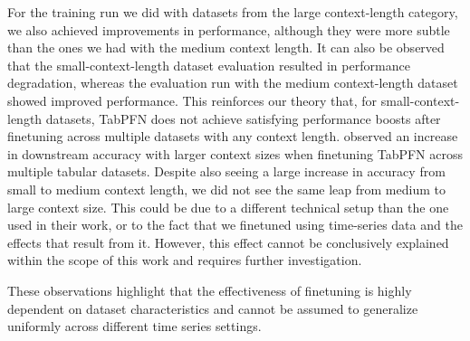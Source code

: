 For the training run we did with datasets from the large context-length category, we also achieved improvements in performance, although they were more subtle than the ones we had with the medium context length.
It can also be observed that the small-context-length dataset evaluation resulted in performance degradation, whereas the evaluation run with the medium context-length dataset showed improved performance.
This reinforces our theory that, for small-context-length datasets, TabPFN does not achieve satisfying performance boosts after finetuning across multiple datasets with any context length.
\newline
\citet{Hollmann_2025} observed an increase in downstream accuracy with larger context sizes when finetuning TabPFN across multiple tabular datasets.
Despite also seeing a large increase in accuracy from small to medium context length, we did not see the same leap from medium to large context size.
This could be due to a different technical setup than the one used in their work, or to the fact that we finetuned using time-series data and the effects that result from it.
However, this effect cannot be conclusively explained within the scope of this work and requires further investigation.

These observations highlight that the effectiveness of finetuning is highly dependent on dataset characteristics and cannot be assumed to generalize uniformly across different time series settings.










